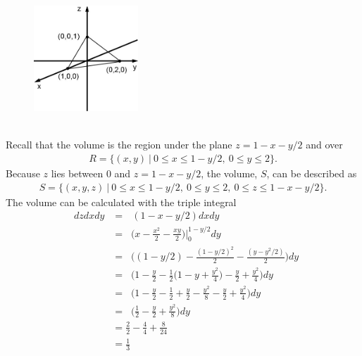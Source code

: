 \documentclass{article}
\begin{document}
\BEN
\item %
 \\
\begin{figure}[h]
  \vspace{-1pt}
  \begin{center}
    \includegraphics[width=0.35\textwidth]{TetExample.jpg}
  \end{center}
\end{figure}\\
Recall that the volume is the region under the plane $z = 1 - x - y/2$ and over  
\begin{align*}
  R = \{ (x,y) \ | \ 0 \le x \le 1- y/2, \ 0 \le y \le 2 \}.
\end{align*}
Because $z$ lies between 0 and $z = 1 - x - y/2$, the volume, $S$, can be described as
\begin{align*}
  S = \{ (x,y,z) \ | \ 0 \le x \le 1- y/2, \ 0 \le y \le 2, \ 0 \le z \le 1 - x - y/2 \}.
\end{align*}
The volume can be calculated with the triple integral
\begin{align*}
  \mathop{\int_{0}^{2} \! \int_0^{1-y/2} \int_0^{1-x-y/2} }dzdxdy
  &= \mathop{\int_{0}^{2} \! \int_0^{1-y/2}  } ( 1-x-y/2) dxdy\\
  &= \mathop{\int_{0}^{2}  } \Big( x-\frac{x^2}{2}-\frac{xy}{2}\Big)\Big|_0^{1-y/2} dy \\
  &= \mathop{\int_{0}^{2}  } \Big( (1-y/2)-\frac{(1-y/2)^2}{2}-\frac{(y-y^2/2)}{2}\Big) dy \\
  &= \mathop{\int_{0}^{2}  } \Bigg( 1 - \frac{y}{2}-\frac{1}{2}\Big(1 - y + \frac{y^2}{4}\Big)-\frac{y}{2}+\frac{y^2}{4}\Bigg) dy \\
  &= \mathop{\int_{0}^{2}  } \Bigg( 1 - \frac{y}{2} - \frac{1}{2} + \frac{y}{2} - \frac{y^2}{8} -\frac{y}{2}+\frac{y^2}{4}\Bigg) dy \\
  &= \mathop{\int_{0}^{2}  } \Big( \frac{1}{2} - \frac{y}{2} + \frac{y^2}{8} \Big) dy \\
  &= \frac{2}{2} - \frac{4}{4}  + \frac{8}{24} \\
  &= \frac{1}{3}
\end{align*} 
\end{document}
